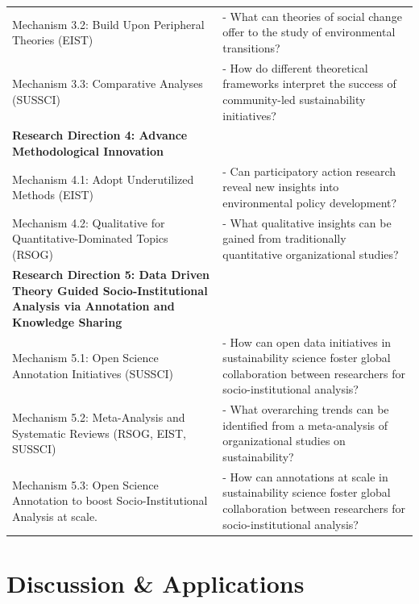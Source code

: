 \documentclass[12pt]{article}
\begin{document}
\begin{longtable}{|p{}|p{}|}
Mechanism 3.2: Build Upon Peripheral Theories (EIST) & 
- What can theories of social change offer to the study of environmental transitions? \\
Mechanism 3.3: Comparative Analyses (SUSSCI) & 
- How do different theoretical frameworks interpret the success of community-led sustainability initiatives? \\
\hline
\textbf{Research Direction 4: Advance Methodological Innovation} & \\
Mechanism 4.1: Adopt Underutilized Methods (EIST) & 
- Can participatory action research reveal new insights into environmental policy development? \\
Mechanism 4.2: Qualitative for Quantitative-Dominated Topics (RSOG) & 
- What qualitative insights can be gained from traditionally quantitative organizational studies? \\
\hline
\textbf{Research Direction 5: Data Driven Theory Guided Socio-Institutional Analysis via Annotation and Knowledge Sharing} & \\
Mechanism 5.1: Open Science Annotation Initiatives (SUSSCI) & 
- How can open data initiatives in sustainability science foster global collaboration between researchers for socio-institutional analysis? \\
Mechanism 5.2: Meta-Analysis and Systematic Reviews (RSOG, EIST, SUSSCI) & 
- What overarching trends can be identified from a meta-analysis of organizational studies on sustainability? \\
Mechanism 5.3: Open Science Annotation to boost Socio-Institutional Analysis at scale.& 
- How can annotations at scale in sustainability science foster global collaboration between researchers for socio-institutional analysis? \\
\end{longtable}
\section{Discussion \& Applications}
\end{document}
